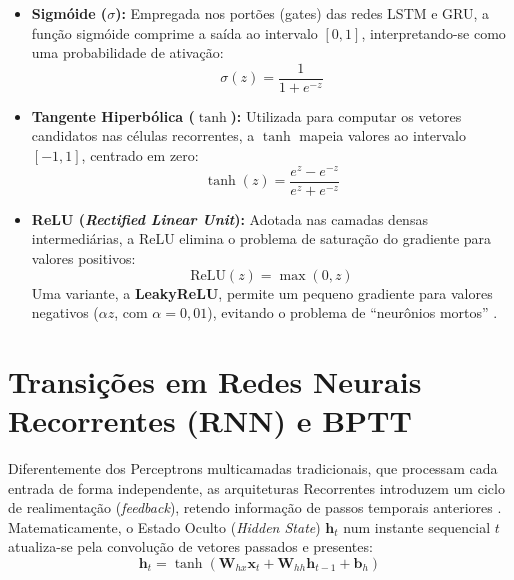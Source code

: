 \begin{itemize}
    \item \textbf{Sigmóide ($\sigma$):} Empregada nos portões (gates) das redes LSTM e GRU, a função sigmóide comprime a saída ao intervalo $[0, 1]$, interpretando-se como uma probabilidade de ativação:
    \begin{equation}
        \sigma(z) = \frac{1}{1 + e^{-z}}
    \end{equation}

    \item \textbf{Tangente Hiperbólica ($\tanh$):} Utilizada para computar os vetores candidatos nas células recorrentes, a $\tanh$ mapeia valores ao intervalo $[-1, 1]$, centrado em zero:
    \begin{equation}
        \tanh(z) = \frac{e^z - e^{-z}}{e^z + e^{-z}}
    \end{equation}

    \item \textbf{ReLU (\textit{Rectified Linear Unit}):} Adotada nas camadas densas intermediárias, a ReLU elimina o problema de saturação do gradiente para valores positivos:
    \begin{equation}
        \text{ReLU}(z) = \max(0, z)
    \end{equation}
    Uma variante, a \textbf{LeakyReLU}, permite um pequeno gradiente para valores negativos ($\alpha z$, com $\alpha = 0{,}01$), evitando o problema de ``neurônios mortos'' \cite{goodfellow2016deep}.
\end{itemize}

\section{Transições em Redes Neurais Recorrentes (RNN) e BPTT}
Diferentemente dos Perceptrons multicamadas tradicionais, que processam cada entrada de forma independente, as arquiteturas Recorrentes introduzem um ciclo de realimentação (\textit{feedback}), retendo informação de passos temporais anteriores \cite{mitchell1997machine}. Matematicamente, o Estado Oculto (\textit{Hidden State}) $\textbf{h}_t$ num instante sequencial $t$ atualiza-se pela convolução de vetores passados e presentes:
\begin{equation}
    \textbf{h}_t = \tanh(\textbf{W}_{hx} \textbf{x}_t + \textbf{W}_{hh} \textbf{h}_{t-1} + \textbf{b}_h)
\end{equation}


